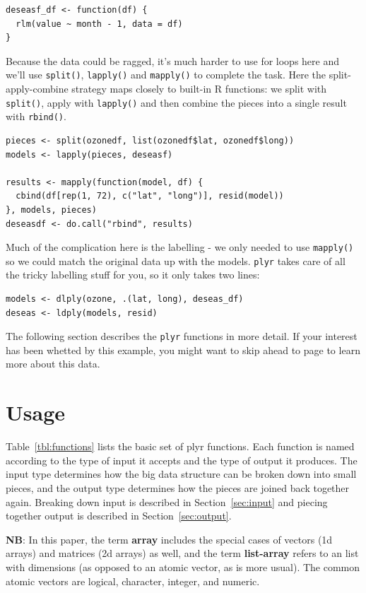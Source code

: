 \documentclass{scrartcl}
\newcommand{\f}[1]{\lstinline!#1()!}
\newcommand{\plyr}{{\tt plyr}\xspace}
\begin{document}
\begin{verbatim}
deseasf_df <- function(df) {
  rlm(value ~ month - 1, data = df)
}
\end{verbatim}

Because the data could be ragged, it's much harder to use for loops here and  we'll use \f{split}, \f{lapply} and \f{mapply} to complete the task.  Here the split-apply-combine strategy maps closely to built-in R functions: we split with \f{split}, apply with \f{lapply} and then combine the pieces into a single result with \f{rbind}.

\begin{verbatim}
pieces <- split(ozonedf, list(ozonedf$lat, ozonedf$long))
models <- lapply(pieces, deseasf)

results <- mapply(function(model, df) {
  cbind(df[rep(1, 72), c("lat", "long")], resid(model))
}, models, pieces)
deseasdf <- do.call("rbind", results)
\end{verbatim}

Much of the complication here is the labelling - we only needed to use \f{mapply} so we could match the original data up with the models. \plyr takes care of all the tricky labelling stuff for you, so it only takes two lines:

\begin{verbatim}
models <- dlply(ozone, .(lat, long), deseas_df)
deseas <- ldply(models, resid)
\end{verbatim}

The following section describes the \plyr functions in more detail.  If your interest has been whetted by this example, you might want to skip ahead to page \pageref{sub:ozone} to learn more about this data.

\section{Usage}
\label{sec:usage}

Table~\ref{tbl:functions} lists the basic set of plyr functions.  Each function is named according to the type of input it accepts and the type of output it produces.  The input type determines how the big data structure can be broken down into small pieces, and the output type determines how the pieces are joined back together again.  Breaking down input is described in Section~\ref{sec:input} and piecing together output is described in Section~\ref{sec:output}.

{\bf NB}: In this paper, the term {\bf array} includes the special cases of vectors (1d arrays) and matrices (2d arrays) as well, and the term {\bf list-array} refers to an list with dimensions (as opposed to an atomic vector, as is more usual).  The common atomic vectors are logical, character, integer, and numeric.
\end{document}
